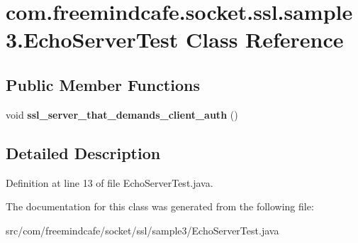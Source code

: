 \hypertarget{classcom_1_1freemindcafe_1_1socket_1_1ssl_1_1sample3_1_1_echo_server_test}{}\section{com.\+freemindcafe.\+socket.\+ssl.\+sample3.\+Echo\+Server\+Test Class Reference}
\label{classcom_1_1freemindcafe_1_1socket_1_1ssl_1_1sample3_1_1_echo_server_test}
\subsection*{Public Member Functions}
\begin{DoxyCompactItemize}
\item 
\hypertarget{classcom_1_1freemindcafe_1_1socket_1_1ssl_1_1sample3_1_1_echo_server_test_a24e75e6a77eda0f5ee495d78aa0127c5}{}void {\bfseries ssl\+\_\+server\+\_\+that\+\_\+demands\+\_\+client\+\_\+auth} ()\label{classcom_1_1freemindcafe_1_1socket_1_1ssl_1_1sample3_1_1_echo_server_test_a24e75e6a77eda0f5ee495d78aa0127c5}

\end{DoxyCompactItemize}


\subsection{Detailed Description}


Definition at line 13 of file Echo\+Server\+Test.\+java.



The documentation for this class was generated from the following file\+:\begin{DoxyCompactItemize}
\item 
src/com/freemindcafe/socket/ssl/sample3/Echo\+Server\+Test.\+java\end{DoxyCompactItemize}

